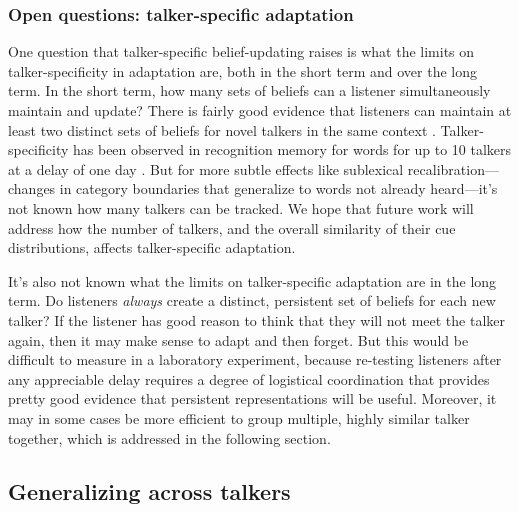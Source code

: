 \subsubsection{Open questions: talker-specific adaptation}
\label{sec:open-quest-talk-1}

One question that talker-specific belief-updating raises is what the limits on talker-specificity in adaptation are, both in the short term and over the long term.  In the short term, how many sets of beliefs can a listener simultaneously maintain and update?  There is fairly good evidence that listeners can maintain at least two distinct sets of beliefs for novel talkers in the same context \autocite{Munson2011,Kraljic2007}.   Talker-specificity has been observed in recognition memory for words for up to 10 talkers at a delay of one day \autocite{Goldinger1996}.  But for more subtle effects like sublexical recalibration---changes in category boundaries that generalize to words not already heard---it's not known how many talkers can be tracked.  We hope that future work will address how the number of talkers, and the overall similarity of their cue distributions, affects talker-specific adaptation.

It's also not known what the limits on talker-specific adaptation are in the long term. Do listeners \emph{always} create a distinct, persistent set of beliefs for each new talker?  If the listener has good reason to think that they will not meet the talker again, then it may make sense to adapt and then forget.  But this would be difficult to measure in a laboratory experiment, because re-testing listeners after any appreciable delay requires a degree of logistical coordination that provides pretty good evidence that persistent representations will be useful.  Moreover, it may in some cases be more efficient to group multiple, highly similar talker together, which is addressed in the following section.


\subsection{Generalizing across talkers}
\label{sec:gener-across-talk}



